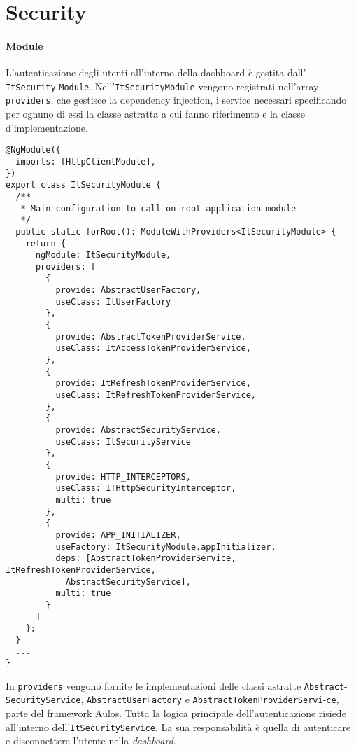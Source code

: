\section{Security}
\label{chap:security}

\paragraph{Module}
L'autenticazione degli utenti all'interno della dashboard è gestita dall' \verb|ItSecurity|-\verb|Module|. Nell'\verb|ItSecurityModule| vengono registrati nell'array \verb|providers|, che gestisce la dependency injection, i service necessari specificando per ognuno di essi la classe astratta a cui fanno riferimento e la classe d'implementazione.
\begin{lstlisting}[caption={Injection dei service nell'ItSecurityModule}, style=javaScriptCode]
@NgModule({
  imports: [HttpClientModule],
})
export class ItSecurityModule {
  /**
   * Main configuration to call on root application module
   */
  public static forRoot(): ModuleWithProviders<ItSecurityModule> {
    return {
      ngModule: ItSecurityModule,
      providers: [
        {
          provide: AbstractUserFactory,
          useClass: ItUserFactory
        },
        {
          provide: AbstractTokenProviderService,
          useClass: ItAccessTokenProviderService,
        },
        {
          provide: ItRefreshTokenProviderService,
          useClass: ItRefreshTokenProviderService,
        },
        {
          provide: AbstractSecurityService,
          useClass: ItSecurityService
        },
        {
          provide: HTTP_INTERCEPTORS,
          useClass: ITHttpSecurityInterceptor,
          multi: true
        },
        {
          provide: APP_INITIALIZER,
          useFactory: ItSecurityModule.appInitializer,
          deps: [AbstractTokenProviderService, ItRefreshTokenProviderService, 
            AbstractSecurityService],
          multi: true
        }
      ]
    };
  }
  ...
}
\end{lstlisting}
In \verb|providers| vengono fornite le implementazioni delle classi astratte
\verb|Abstract|-\verb|SecurityService|, \verb|AbstractUserFactory| e \verb|AbstractTokenProviderServi|-\verb|ce|, parte del framework Aulos.
Tutta la logica principale dell'autenticazione risiede all'interno dell'\verb|ItSecurityService|. La sua responsabilità è quella di autenticare e disconnettere l'utente nella \textit{dashboard}. \\
